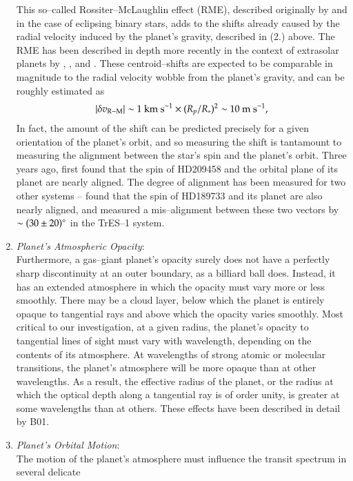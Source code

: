 \begin{enumerate}
This so--called Rossiter--McLaughlin effect (RME), described
originally by \citet{rossiter1924} and \citet{mclaughlin1924} in the
case of eclipsing binary stars, adds to the shifts already caused by
the radial velocity induced by the planet's gravity, described in (2.)
above.  The RME has been described in depth more recently in the
context of extrasolar planets by \citet{ohta_et_al2005},
\citet{gimenez_et_al2006}, and \citet{gaudi+winn2007}.  These
centroid--shifts are expected to be comparable in magnitude to the
radial velocity wobble from the planet's gravity, and can be roughly
estimated as
\[
\left| \delta v_{\rm R-M} \right| \sim 1 {\rm ~km~s^{-1}} \times (R_p/R_*)^2 \sim 10 {\rm ~m~s^{-1}},
\]
In fact, the amount of the shift can be predicted precisely for a
given orientation of the planet's orbit, and so measuring the shift is
tantamount to measuring the alignment between the star's spin and the
planet's orbit.  Three years ago, \citet{winn_et_al2005} first found
that the spin of HD209458 and the orbital plane of its planet are
nearly aligned.  The degree of alignment has been measured for two
other systems -- \citet{winn_et_al2006} found that the spin of
HD189733 and its planet are also nearly aligned, and
\citet{narita_et_al2007} measured a mis--alignment between these two
vectors by $\sim (30 \pm 20)\mbox{$^\circ$}$ in the TrES--1 system.
\item {\it Planet's Atmospheric Opacity}:\\ Furthermore, a gas--giant
 planet's opacity surely does not have a perfectly sharp discontinuity
 at an outer boundary, as a billiard ball does.  Instead, it has an
 extended atmosphere in which the opacity must vary more or less
 smoothly.  There may be a cloud layer, below which the planet is
 entirely opaque to tangential rays and above which the opacity varies
 smoothly.  Most critical to our investigation, at a given radius, the
 planet's opacity to tangential lines of sight must vary with
 wavelength, depending on the contents of its atmosphere.  At
 wavelengths of strong atomic or molecular transitions, the planet's
 atmosphere will be more opaque than at other wavelengths.  As a
 result, the effective radius of the planet, or the radius at which
 the optical depth along a tangential ray is of order unity, is
 greater at some wavelengths than at others.  These effects have been
 described in detail by B01.
\item {\it Planet's Orbital Motion}:\\ The motion of the planet's
 atmosphere must influence the transit spectrum in several delicate

\end{enumerate}
